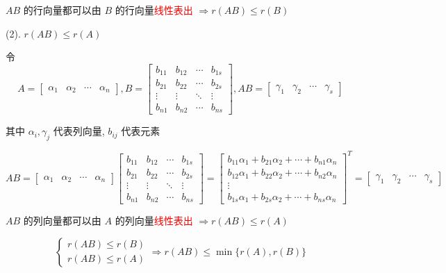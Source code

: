 \begin{anymark}[证明]
	$AB$ 的行向量都可以由 $B$ 的行向量\textcolor{red}{线性表出} $\Rightarrow r(AB)\leq r(B)$

	(2). $r(AB) \leq r(A)$

	令
	$$A = \begin{bmatrix}
		\alpha_{1} & \alpha_{2} & \cdots & \alpha_{n}
	\end{bmatrix},
	B = \begin{bmatrix}
		b_{11} & b_{12} & \cdots & b_{1s}\\
		b_{21} & b_{22} & \cdots & b_{2s}\\
		\vdots & \vdots & \ddots & \vdots\\
		b_{n1} & b_{n2} & \cdots & b_{ns}
	\end{bmatrix},
	AB = \begin{bmatrix}
		\gamma_{1} & \gamma_{2} & \cdots & \gamma_{s}
	\end{bmatrix}$$

	其中 $\alpha_{i}, \gamma_{j}$ 代表列向量, $b_{ij}$ 代表元素

	$$AB =
	\begin{bmatrix}
		\alpha_{1} & \alpha_{2} & \cdots & \alpha_{n}
	\end{bmatrix}
	\begin{bmatrix}
		b_{11} & b_{12} & \cdots & b_{1s}\\
		b_{21} & b_{22} & \cdots & b_{2s}\\
		\vdots & \vdots & \ddots & \vdots\\
		b_{n1} & b_{n2} & \cdots & b_{ns}
	\end{bmatrix} =
	\begin{bmatrix}
		b_{11}\alpha_{1}+b_{21}\alpha_{2}+\cdots+b_{n1}\alpha_{n}\\
		b_{12}\alpha_{1}+b_{22}\alpha_{2}+\cdots+b_{n2}\alpha_{n}\\
		\vdots\\
		b_{1s}\alpha_{1}+b_{2s}\alpha_{2}+\cdots+b_{ns}\alpha_{n}
	\end{bmatrix}^{T} =
	\begin{bmatrix}
		\gamma_{1} & \gamma_{2} & \cdots & \gamma_{s}
	\end{bmatrix}$$

	$AB$ 的列向量都可以由 $A$ 的列向量\textcolor{red}{线性表出} $\Rightarrow r(AB)\leq r(A)$

	$$\begin{cases}
		r(AB)\leq r(B)\\
		r(AB)\leq r(A)
	\end{cases}\Rightarrow r(AB) \leq \min\{r(A),r(B)\}$$
\end{anymark}

